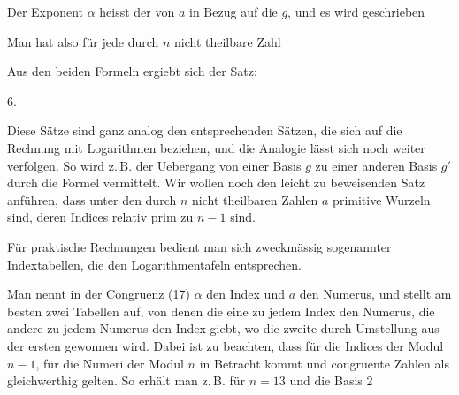 
Der Exponent $\alpha$ heisst der  von $a$ in Bezug auf die 
$g$, und es wird geschrieben

Man hat also für jede durch $n$ nicht theilbare Zahl

Aus den beiden Formeln
ergiebt sich der Satz:

6.\ 

Diese Sätze sind ganz analog den entsprechenden Sätzen, die sich auf die
Rechnung mit Logarithmen beziehen, und die Analogie lässt sich noch
weiter verfolgen. So wird z.\,B. der Uebergang von einer Basis $g$ zu
einer anderen Basis $g'$ durch die Formel
vermittelt. Wir wollen noch den leicht zu beweisenden Satz anführen,
dass unter den durch $n$ nicht theilbaren Zahlen $a$ 
primitive Wurzeln sind, deren Indices relativ prim zu $n-1$ sind.

Für praktische Rechnungen bedient man sich zweckmässig sogenannter
Indextabellen, die den Logarithmentafeln entsprechen.

Man nennt in der Congruenz (17) $\alpha$ den Index und $a$ den Numerus,
und stellt am besten zwei Tabellen auf, von denen die eine zu jedem
Index den Numerus, die andere zu jedem Numerus den Index giebt, wo die
zweite durch Umstellung aus der ersten gewonnen wird. Dabei ist zu
beachten, dass für die Indices der Modul $n-1$, für die Numeri der
Modul $n$ in Betracht kommt und congruente Zahlen als gleichwerthig
gelten. So erhält man z.\,B. für $n = 13$ und die Basis 2

